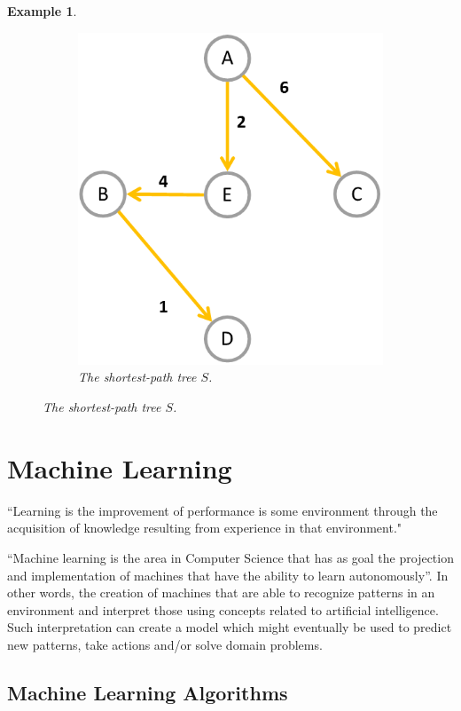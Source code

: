 \documentclass[12pt]{report}
\newtheorem{example}{Example}[section]
\begin{document}
\begin{example}
\begin{figure}[H]
\begin{subfigure}{.4\linewidth}
			\includegraphics[width=\linewidth]{graphs/spa-tree}
			\captionsetup{justification=centering}
			\caption{The shortest-path tree $S$.}
			\label{fig:spa-tree}
		\end{subfigure}
	\end{figure}
\end{example}

\section{Machine Learning}
“Learning is the improvement of performance is some environment through the acquisition of knowledge resulting from experience in that environment." \cite{pat1996}

“Machine learning is the area in Computer Science that has as goal the projection and implementation of machines that have the ability to learn autonomously”. \cite{hot2009} In other words, the creation of machines that are able to recognize patterns in an environment and interpret those using concepts related to artificial intelligence. Such interpretation can create a model which might eventually be used to predict new patterns, take actions and/or solve domain problems.

\subsection{Machine Learning Algorithms}
\end{document}
